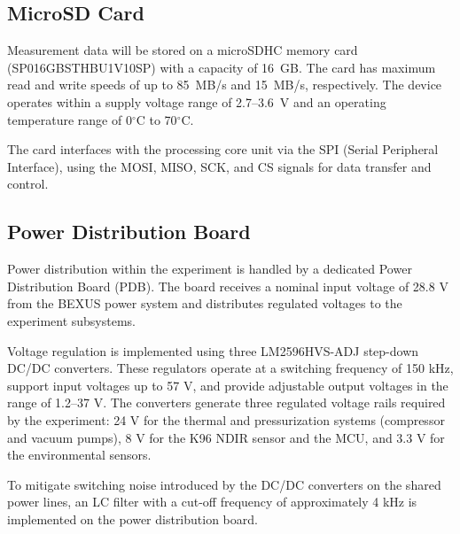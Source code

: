 \documentclass[
  a4paper,
  11pt,
  openany,
  parskip,
  toc=totoc,
  listof=totoc,
  bibliography=totoc
]{scrreprt}
\newcommand{\degree}{\ensuremath{^\circ}} %
\begin{document}
\subsection{MicroSD Card}


Measurement data will be stored on a microSDHC memory card (SP016GBSTHBU1V10SP) with a capacity of 16~GB. The card has maximum read and write speeds of up to 85~MB/s and 15~MB/s, respectively. The device operates within a supply voltage range of 2.7--3.6~V and an operating temperature range of 0\degree C to 70\degree C.

The card interfaces with the processing core unit via the SPI (Serial Peripheral Interface), using the MOSI, MISO, SCK, and CS signals for data transfer and control.

\subsection{Power Distribution Board}

Power distribution within the experiment is handled by a dedicated Power Distribution Board (PDB). The board receives a nominal input voltage of 28.8 V from the BEXUS power system and distributes regulated voltages to the experiment subsystems.

Voltage regulation is implemented using three LM2596HVS-ADJ step-down DC/DC converters. These regulators operate at a switching frequency of 150 kHz, support input voltages up to 57 V, and provide adjustable output voltages in the range of 1.2–37 V. The converters generate three regulated voltage rails required by the experiment: 24 V for the thermal and pressurization systems (compressor and vacuum pumps), 8 V for the K96 NDIR sensor and the MCU, and 3.3 V for the environmental sensors.

To mitigate switching noise introduced by the DC/DC converters on the shared power lines, an LC filter with a cut-off frequency of approximately 4 kHz is implemented on the power distribution board.
\end{document}
